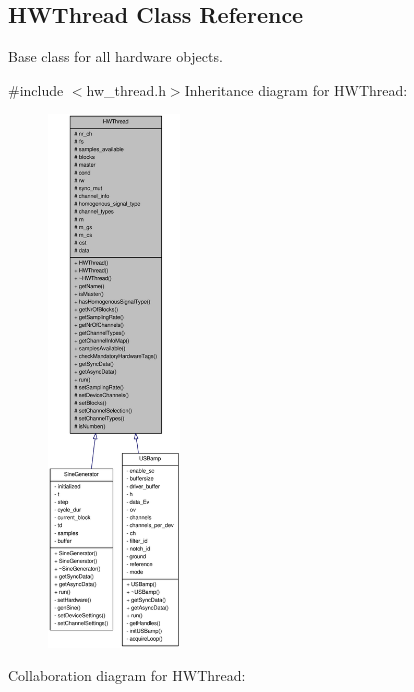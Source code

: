 \hypertarget{class_h_w_thread}{
\subsection{HWThread Class Reference}
\label{class_h_w_thread}
}


Base class for all hardware objects.  


{\ttfamily \#include $<$hw\_\-thread.h$>$}Inheritance diagram for HWThread:\nopagebreak
\begin{figure}[H]
\begin{center}
\leavevmode
\includegraphics[height=400pt]{class_h_w_thread__inherit__graph}
\end{center}
\end{figure}
Collaboration diagram for HWThread:\nopagebreak
